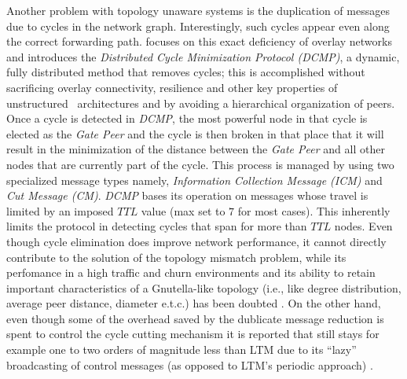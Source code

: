 Another problem with topology unaware
systems is the duplication of messages due to cycles in the network graph.
Interestingly, such cycles appear even along the correct forwarding path.
\cite{ZKB2008} focuses on this exact deficiency of overlay networks and
introduces the \emph{Distributed Cycle Minimization Protocol
(DCMP)}, a dynamic, fully distributed method that removes cycles;
this is accomplished without sacrificing
overlay connectivity, resilience and other key properties of unstructured
\p\ architectures and by avoiding a hierarchical organization of peers. 
Once a cycle is detected in {\it DCMP}, the most powerful node in that cycle 
is elected as the \emph{Gate Peer} and the cycle is then broken in that place
that it will result in the minimization of the distance between the
\emph{Gate Peer} and all other nodes that are currently part of the cycle. 
This process is managed by using two specialized message types 
namely, \emph{Information Collection Message (ICM)} and \emph{Cut Message (CM)}. 
\emph{DCMP} bases its operation on messages whose travel is limited by an
imposed $TTL$ value (max set to $7$ for most cases). This inherently limits
the protocol in detecting cycles that span for more than $TTL$ nodes.
Even though cycle elimination does improve network performance, 
it cannot  directly contribute to the solution of the topology mismatch
problem, while its perfomance in a high traffic and churn environments and its
ability to retain important characteristics of a Gnutella-like topology (i.e.,
like degree distribution, average peer distance, diameter e.t.c.) has been
doubted \cite{SCG2009,CSG2010}. On the other hand, even though some of the overhead
saved by the dublicate message reduction is spent to control the cycle cutting
mechanism it is reported that still stays for example one to two orders of
magnitude less than LTM due to its ``lazy'' broadcasting of control messages
(as opposed to LTM's periodic approach) \cite{ZKB2008}.
%
%
